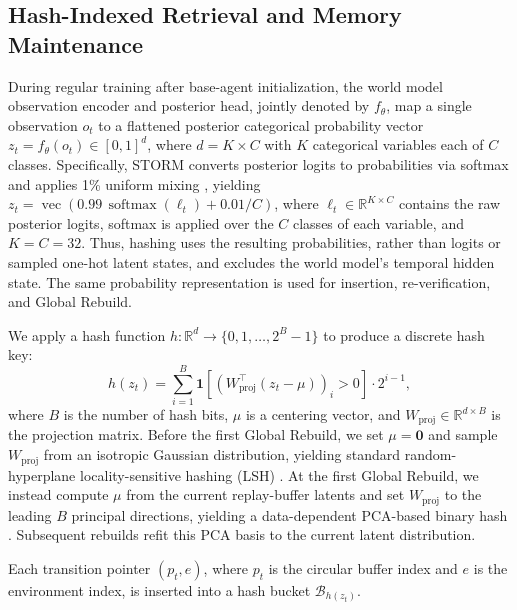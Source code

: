 \documentclass{article} %
\begin{document}
\subsection{Hash-Indexed Retrieval and Memory Maintenance}
\label{subsec:flash_memory}

During regular training after base-agent initialization, the world model observation encoder and posterior head, jointly denoted by $f_\theta$, map a single observation $o_t$ to a flattened posterior categorical probability vector $z_t = f_\theta(o_t) \in [0,1]^{d}$, where $d = K \times C$ with $K$ categorical variables each of $C$ classes. Specifically, STORM converts posterior logits to probabilities via softmax and applies 1\% uniform mixing \citep{hafner2019dream}, yielding $z_t = \operatorname{vec}(0.99\,\operatorname{softmax}(\ell_t) + 0.01/C)$, where $\ell_t \in \mathbb{R}^{K \times C}$ contains the raw posterior logits, softmax is applied over the $C$ classes of each variable, and $K=C=32$. Thus, hashing uses the resulting probabilities, rather than logits or sampled one-hot latent states, and excludes the world model's temporal hidden state. The same probability representation is used for insertion, re-verification, and Global Rebuild.

We apply a hash function $h: \mathbb{R}^d \to \{0,1,\ldots,2^B{-}1\}$ to produce a discrete hash key:
\begin{equation}
h(z_t) = \sum_{i=1}^{B} \mathbf{1}\!\left[\left(W_{\text{proj}}^\top (z_t - \mu)\right)_i > 0\right] \cdot 2^{i-1},
\label{eq:lsh}
\end{equation}
where $B$ is the number of hash bits, $\mu$ is a centering vector, and $W_{\text{proj}} \in \mathbb{R}^{d \times B}$ is the projection matrix. Before the first Global Rebuild, we set $\mu=\mathbf{0}$ and sample $W_{\text{proj}}$ from an isotropic Gaussian distribution, yielding standard random-hyperplane locality-sensitive hashing (LSH) \citep{charikar2002similarity}. At the first Global Rebuild, we instead compute $\mu$ from the current replay-buffer latents and set $W_{\text{proj}}$ to the leading $B$ principal directions, yielding a data-dependent PCA-based binary hash \citep{lin2010spec}. Subsequent rebuilds refit this PCA basis to the current latent distribution.

Each transition pointer $(p_t, e)$, where $p_t$ is the circular buffer index and $e$ is the environment index, is inserted into a hash bucket $\mathcal{B}_{h(z_t)}$.
\end{document}
